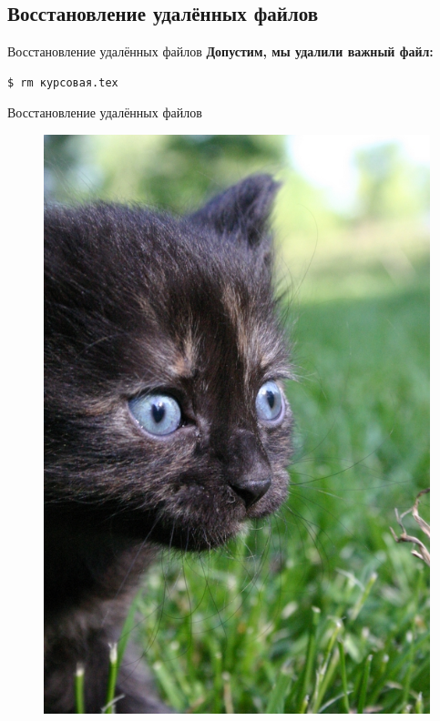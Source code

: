 \documentclass[presentation]{beamer}
\begin{document}


\subsection{Восстановление удалённых файлов}

\begin{frame}[fragile]{Восстановление удалённых файлов}
  \Large
  \textbf{Допустим, мы удалили важный файл:}
\begin{verbatim}
$ rm курсовая.tex
\end{verbatim}
\end{frame}

\begin{frame}[fragile]{Восстановление удалённых файлов}
  \begin{figure}[htb]
    \includegraphics[height=.9\textheight]{blue-eyed-kitten}
  \end{figure}
\end{frame}
\end{document}

